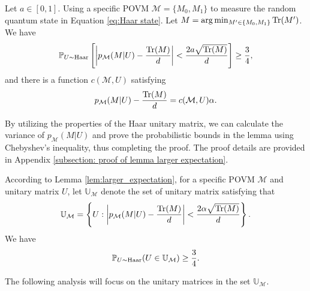 \begin{lemma}\label{lem:larger_expectation}
    Let $a \in [0,1]$. Using a specific POVM $\mathcal{M} =\{M_0, M_1\}$ to measure the random quantum state in Equation \eqref{eq:Haar state}. Let $M = \arg\min_{M' \in\{M_0,M_1\}} \mathrm{Tr}(M')$. We have
    \begin{equation*}
        \mathbb{P}_{U \sim \mathrm{Haar}} \left[ \left|p_{\mathcal{M}}(M| U) - \frac{\mathrm{Tr}(M)}{d}\right| < \frac{2a\sqrt{\mathrm{Tr}(M)}}{d}\right] \geq \frac{3}{4},
    \end{equation*}
    and there is a function $c(\mathcal{M},U)$ satisfying
    \begin{equation*}
        p_{\mathcal{M}}(M| U)- \frac{\mathrm{Tr}(M)}{d} =  c(\mathcal{M},U)\alpha.
    \end{equation*}
\end{lemma}
\begin{proof-sketch}
    By utilizing the properties of the Haar unitary matrix, we can calculate the variance of $p_\mathcal{M}(M|U)$ and prove the probabilistic bounds in the lemma using Chebyshev's inequality, thus completing the proof. The proof details are provided in Appendix \ref{subsection: proof of lemma larger expectation}.
\end{proof-sketch}

According to Lemma \ref{lem:larger_expectation}, for a specific POVM $\mathcal{M}$ and unitary matrix $U$, let $\mathbb{U}_{\mathcal{M}}$ denote the set of unitary matrix satisfying that 
\begin{equation*}
    \mathbb{U}_{\mathcal{M}} = \left\{U : \left|p_{\mathcal{M}}(M| U) - \frac{\mathrm{Tr}(M)}{d}\right| < \frac{2\alpha\sqrt{\mathrm{Tr}(M)}}{d}\right\}.
\end{equation*}
We have
\begin{equation}
    \mathbb{P}_{U \sim \mathrm{Haar}}(U \in \mathbb{U}_\mathcal{M}) \geq \frac{3}{4}.
\end{equation}

The following analysis will focus on the unitary matrices in the set $\mathbb{U}_\mathcal{M}$.


